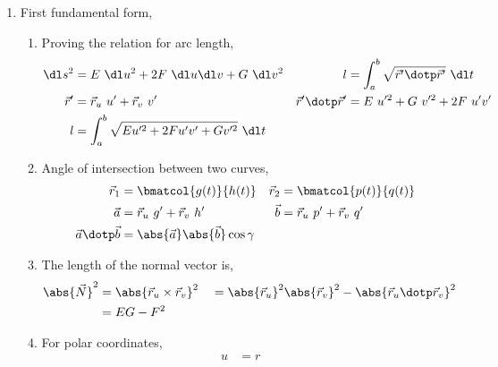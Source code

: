 \begin{enumerate}
    \item First fundamental form,
          \begin{enumerate}
              \item Proving the relation for arc length,
                    \begin{align}
                        \dl s^2                 & = E\ \dl u ^2 + 2F\ \dl u \dl v
                        + G\ \dl v^2            &
                        l                       & = \int_a^b \sqrt{\vec{r}' \dotp
                        \vec{r}'}\ \dl t                                            \\
                        \vec{r}'                & = \vec{r}_u\ u' + \vec{r}_v\ v' &
                        \vec{r}' \dotp \vec{r}' & = E\ u'^2 + G\ v'^2 + 2F\ u'v'    \\
                        l                       & = \int_{a}^{b} \sqrt{Eu'^2
                            + 2Fu'v' + Gv'^2}\ \dl t
                    \end{align}
              \item Angle of intersection between two curves,
                    \begin{align}
                        \vec{r}_1             & = \bmatcol{g(t)}{h(t)}          &
                        \vec{r}_2             & = \bmatcol{p(t)}{q(t)}            \\
                        \vec{a}               & = \vec{r}_u\ g' + \vec{r}_v\ h' &
                        \vec{b}               & = \vec{r}_u\ p' + \vec{r}_v\ q'   \\
                        \vec{a} \dotp \vec{b} & = \abs{\vec{a}} \abs{\vec{b}}
                        \cos\gamma
                    \end{align}
              \item The length of the normal vector is,
                    \begin{align}
                        \abs{\vec{N}}^2 & = \abs{\vec{r}_u \times \vec{r}_v}^2  &
                                        & = \abs{\vec{r}_u}^2 \abs{\vec{r}_v}^2
                        - \abs{\vec{r}_u \dotp \vec{r}_v}^2                       \\
                                        & = EG - F^2
                    \end{align}
              \item For polar coordinates,
                    \begin{align}
                        u         & = r                             &

\end{align}
\end{enumerate}
\end{enumerate}
